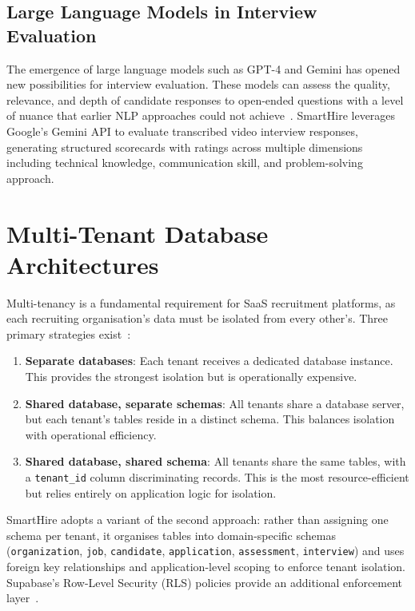 \subsection{Large Language Models in Interview Evaluation}

The emergence of large language models such as GPT-4 and Gemini has opened new possibilities for interview evaluation. These models can assess the quality, relevance, and depth of candidate responses to open-ended questions with a level of nuance that earlier NLP approaches could not achieve~\cite{gemini2024}. SmartHire leverages Google's Gemini API to evaluate transcribed video interview responses, generating structured scorecards with ratings across multiple dimensions including technical knowledge, communication skill, and problem-solving approach.

\section{Multi-Tenant Database Architectures}
\label{sec:multitenancy-review}

Multi-tenancy is a fundamental requirement for SaaS recruitment platforms, as each recruiting organisation's data must be isolated from every other's. Three primary strategies exist~\cite{chong2006}:

\begin{enumerate}[label=\textbf{\arabic*.}]
  \item \textbf{Separate databases}: Each tenant receives a dedicated database instance. This provides the strongest isolation but is operationally expensive.
  \item \textbf{Shared database, separate schemas}: All tenants share a database server, but each tenant's tables reside in a distinct schema. This balances isolation with operational efficiency.
  \item \textbf{Shared database, shared schema}: All tenants share the same tables, with a \texttt{tenant\_id} column discriminating records. This is the most resource-efficient but relies entirely on application logic for isolation.
\end{enumerate}

SmartHire adopts a variant of the second approach: rather than assigning one schema per tenant, it organises tables into domain-specific schemas (\texttt{organization}, \texttt{job}, \texttt{candidate}, \texttt{application}, \texttt{assessment}, \texttt{interview}) and uses foreign key relationships and application-level scoping to enforce tenant isolation. Supabase's Row-Level Security (RLS) policies provide an additional enforcement layer~\cite{supabase2024}.

